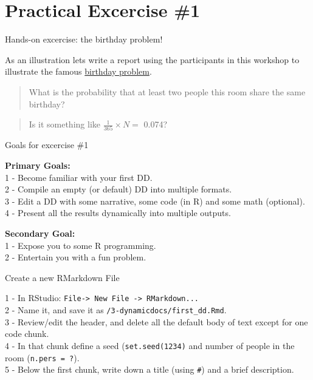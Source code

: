 \documentclass[ignorenonframetext,]{beamer}
\begin{document}
\section{Practical Excercise \#1}\label{practical-excercise-1}

\begin{frame}{Hands-on excercise: the birthday problem!}

As an illustration lets write a report using the participants in this
workshop to illustrate the famous
\href{https://en.wikipedia.org/wiki/Birthday_problem}{birthday problem}.

\begin{quote}
What is the probability that at least two people this room share the
same birthday?
\end{quote}

\begin{quote}
Is it something like \(\frac{1}{365} \times N =\) 0.074?
\end{quote}

\end{frame}

\begin{frame}{Goals for excercise \#1}

\textbf{Primary Goals:}\\
1 - Become familiar with your first DD.\\
2 - Compile an empty (or default) DD into multiple formats.\\
3 - Edit a DD with some narrative, some code (in R) and some math
(optional).\\
4 - Present all the results dynamically into multiple outputs.

\pause 

\textbf{Secondary Goal:}\\
1 - Expose you to some R programming.\\
2 - Entertain you with a fun problem.

\end{frame}

\begin{frame}[fragile]{Create a new RMarkdown File}

1 - In RStudio:
\texttt{File-\textgreater{}\ New\ File\ -\textgreater{}\ RMarkdown...}\\
2 - Name it, and save it as \texttt{/3-dynamicdocs/first\_dd.Rmd}.\\
3 - Review/edit the header, and delete all the default body of text
except for one code chunk.\\
4 - In that chunk define a seed (\texttt{set.seed(1234)} and number of
people in the room (\texttt{n.pers\ =\ ?}).\\
5 - Below the first chunk, write down a title (using \texttt{\#}) and a
brief description.

\end{frame}
\end{document}
